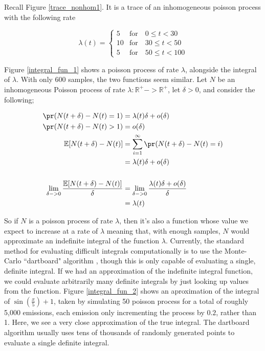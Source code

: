 Recall Figure \ref{trace_nonhom1}. It is a trace of an inhomogeneous poisson process with the following rate

$$
\lambda(t) = 
\begin{cases}
5  & \mbox{for} \quad 0  \leqslant t < 30\\
10 & \mbox{for} \quad 30 \leqslant t < 50\\
5  & \mbox{for} \quad 50 \leqslant t < 100
\end{cases}
$$

Figure \ref{integral_fun_1} shows a poisson process of rate $\lambda$, alongside the integral of $\lambda$. With only 600 samples, the two functions seem similar. Let $N$ be an inhomogeneous Poisson process of rate $\lambda: \mathbb{R}^{+}->\mathbb{R}^{+}$, let $\delta > 0$, and consider the following;

\begin{align*}
\pr (N(t+\delta)-N(t) = 1) &= \lambda(t)\delta + o(\delta)\\
\pr (N(t+\delta)-N(t) > 1) &= o(\delta)\\
\mathbb{E}[N(t+\delta)-N(t)] &= \sum_{i=1}^\infty \pr (N(t+\delta)-N(t) = i)\\
&= \lambda(t)\delta + o(\delta)\\
\\
\lim_{\delta->0} \frac{\mathbb{E}[N(t+\delta)-N(t)]}{\delta} &= \lim_{\delta->0} \frac{\lambda(t)\delta + o(\delta)}{\delta}\\
&= \lambda(t)
\end{align*}

So if $N$ is a poisson process of rate $\lambda$, then it's also a function whose value we expect to increase at a rate of $\lambda$ meaning that, with enough samples, $N$ would approximate an indefinite integral of the function $\lambda$. Currently, the standard method for evaluating difficult integrals computationally is to use the Monte-Carlo ``dartboard" algorithm \cite[]{montecarlo}, though this is only capable of evaluating a single, definite integral. If we had an approximation of the indefinite integral function, we could evaluate arbitrarily many definite integrals by just looking up values from the function. Figure \ref{integral_fun_2} shows an aproximation of the integral of $\sin\left(\frac{x}{5}\right)+1$, taken by simulating 50 poisson process for a total of roughly 5,000 emissions, each emission only incrementing the process by $0.2$, rather than 1. Here, we see a very close approximation of the true integral. The dartboard algorithm usually uses tens of thousands of randomly generated points to evaluate a single definite integral.

